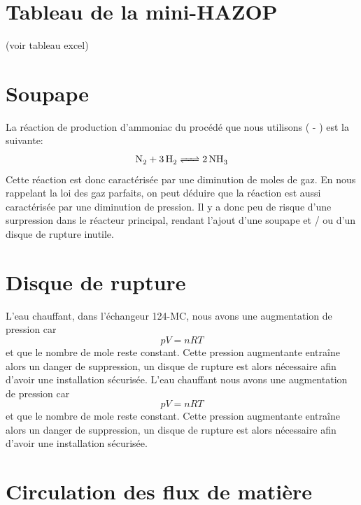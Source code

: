 \documentclass[a4paper,12pt, oneside]{article}
\begin{document}
\section{Tableau de la mini-HAZOP}

(voir tableau excel)

\section{Soupape}
La réaction de production d'ammoniac du procédé que nous utilisons ( - ) est la suivante:
$$\ce{N2 +3H2 <=> 2NH3}$$
Cette réaction est donc caractérisée par une diminution de moles de gaz. En nous rappelant la loi des gaz parfaits, on peut déduire que la réaction est aussi caractérisée par une diminution de pression. Il y a donc peu de risque d'une surpression dans le réacteur principal, rendant l'ajout d'une soupape et / ou d'un disque de rupture inutile.

\section{Disque de rupture}
L'eau chauffant, dans l'échangeur 124-MC, nous avons une augmentation de pression car $$pV=nRT$$ et que le nombre de mole reste constant. Cette pression augmentante entraîne alors un danger de suppression, un disque de rupture est alors nécessaire afin d'avoir une installation sécurisée.
L'eau chauffant nous avons une augmentation de pression car $$pV=nRT$$ et que le nombre de mole reste constant. Cette pression augmentante entraîne alors un danger de suppression, un disque de rupture est alors nécessaire afin d'avoir une installation sécurisée. 

\newpage
\appendix
\section{Circulation des flux de matière}

\label{Annexe Flux}
\end{document}
